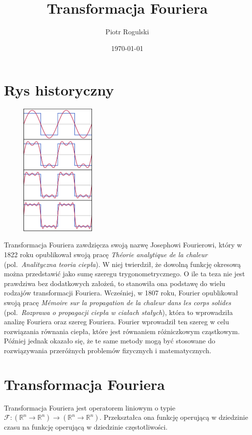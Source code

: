 \documentclass[polish, titlepage, 12pt]{article}
\title{Transformacja Fouriera}
\author{Piotr Rogulski}
\date{\today}
\begin{document}
\maketitle

\tableofcontents

\newpage



\section{Rys historyczny}
\begin{figure}
    \centering
    \includegraphics[width=0.33\textwidth]{img/fourier-series.eps}
\end{figure}
Transformacja Fouriera zawdzięcza swoją nazwę Josephowi Fourierowi, który w 1822 roku
opublikował swoją pracę \textit{Théorie analytique de la chaleur} (pol.\ \textit{Analityczna teoria ciepła}).
W niej twierdził, że dowolną funkcję okresową można przedstawić jako sumę szeregu trygonometrycznego.
O ile ta teza nie jest prawdziwa bez dodatkowych założeń, to stanowiła ona podstawę do wielu
rodzajów transformacji Fouriera. Wcześniej, w 1807 roku, Fourier opublikował swoją pracę
\textit{Mémoire sur la propagation de la chaleur dans les corps solides}
(pol.\ \textit{Rozprawa o propagacji ciepła w ciałach stałych}), która to wprowadziła
analizę Fouriera oraz szereg Fouriera. Fourier wprowadził ten szereg w celu rozwiązania
równania ciepła, które jest równaniem różniczkowym cząstkowym. Później jednak okazało się,
że te same metody mogą być stosowane do rozwiązywania przeróżnych problemów fizycznych i
matematycznych.



\section{Transformacja Fouriera}
Transformacja Fouriera jest operatorem liniowym o typie
\( \mathcal{F}: (\mathbb{R}^n \to \mathbb{R}^n) \to (\mathbb{R}^n \to \mathbb{R}^n) \).
Przekształca ona funkcję operującą w dziedzinie czasu na funkcję operującą w dziedzinie częstotliwości.
\end{document}
